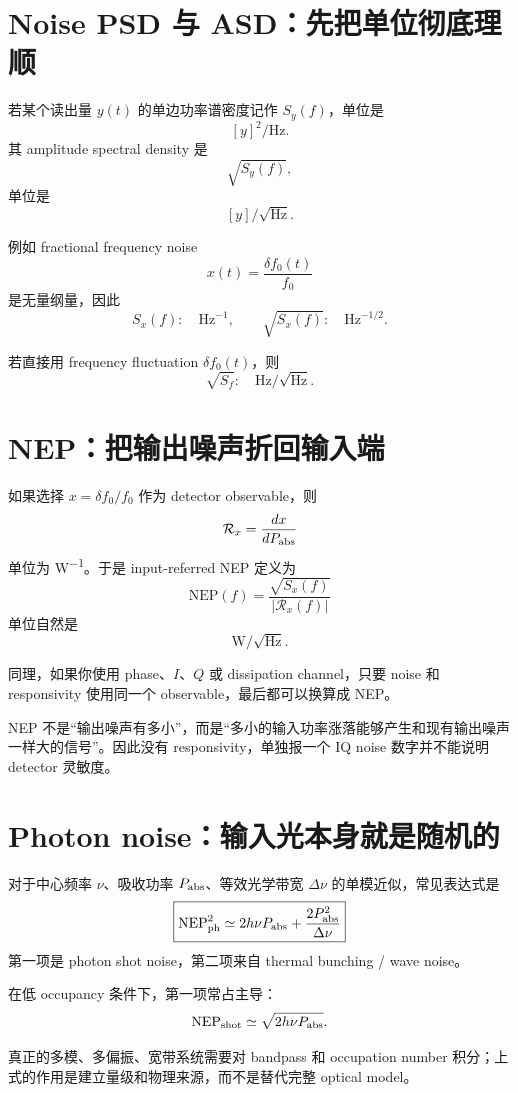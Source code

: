 \documentclass[11pt,a4paper,openany]{ctexrep}
\begin{document}
\section{Noise PSD 与 ASD：先把单位彻底理顺}

若某个读出量 $y(t)$ 的单边功率谱密度记作 $S_y(f)$，单位是
\[
[y]^2/\mathrm{Hz}.
\]
其 amplitude spectral density 是
\[
\sqrt{S_y(f)},
\]
单位是
\[
[y]/\sqrt{\mathrm{Hz}}.
\]

例如 fractional frequency noise
\[
x(t)=\frac{\delta f_0(t)}{f_0}
\]
是无量纲量，因此
\[
S_x(f):\quad \mathrm{Hz}^{-1},
\qquad
\sqrt{S_x(f)}:\quad \mathrm{Hz}^{-1/2}.
\]

若直接用 frequency fluctuation $\delta f_0(t)$，则
\[
\sqrt{S_f}:\quad \mathrm{Hz}/\sqrt{\mathrm{Hz}}.
\]

\section{NEP：把输出噪声折回输入端}

如果选择 $x=\delta f_0/f_0$ 作为 detector observable，则
\[
\mathcal R_x=\frac{dx}{dP_{\rm abs}}
\]
单位为 \si{W^{-1}}。于是 input-referred NEP 定义为
\[
\boxed{
\mathrm{NEP}(f)
=
\frac{\sqrt{S_x(f)}}{|\mathcal R_x(f)|}
}
\]
单位自然是
\[
\boxed{\mathrm{W}/\sqrt{\mathrm{Hz}}}.
\]

同理，如果你使用 phase、$I$、$Q$ 或 dissipation channel，只要 noise 和 responsivity 使用同一个 observable，最后都可以换算成 NEP。

\begin{intuitionbox}
NEP 不是“输出噪声有多小”，而是“多小的输入功率涨落能够产生和现有输出噪声一样大的信号”。因此没有 responsivity，单独报一个 IQ noise 数字并不能说明 detector 灵敏度。
\end{intuitionbox}

\section{Photon noise：输入光本身就是随机的}

对于中心频率 $\nu$、吸收功率 $P_{\rm abs}$、等效光学带宽 $\Delta\nu$ 的单模近似，常见表达式是
\[
\boxed{
\mathrm{NEP}_{\rm ph}^2
\simeq
2h\nu P_{\rm abs}
+
\frac{2P_{\rm abs}^2}{\Delta\nu}
}
\]
第一项是 photon shot noise，第二项来自 thermal bunching / wave noise。

在低 occupancy 条件下，第一项常占主导：
\[
\mathrm{NEP}_{\rm shot}
\simeq
\sqrt{2h\nu P_{\rm abs}}.
\]

真正的多模、多偏振、宽带系统需要对 bandpass 和 occupation number 积分；上式的作用是建立量级和物理来源，而不是替代完整 optical model。
\end{document}
